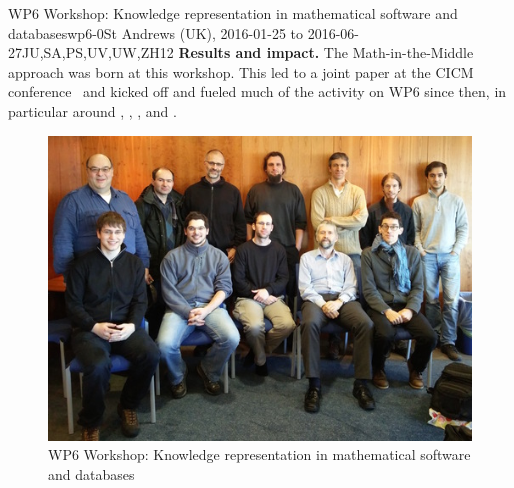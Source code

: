 \begin{event}{WP6 Workshop: Knowledge representation in mathematical software and databases}{wp6-0}{St Andrews (UK), 2016-01-25 to 2016-06-27}{JU,SA,PS,UV,UW,ZH}{12}{}
\textbf{Results and impact.} The Math-in-the-Middle approach was born
at this workshop. This led to a joint paper at the CICM
conference~\cite{DehKohKon:iop16} and kicked off and fueled much of
the activity on WP6 since then, in particular around
, ,
, and
.

\begin{figure}[ht]
  \caption*{WP6 Workshop: Knowledge representation in mathematical software and databases}
  \includegraphics[scale=0.5]{pictures/2016-01-25-DKS-group-picture.jpg}
  \end{figure}
\end{event}

